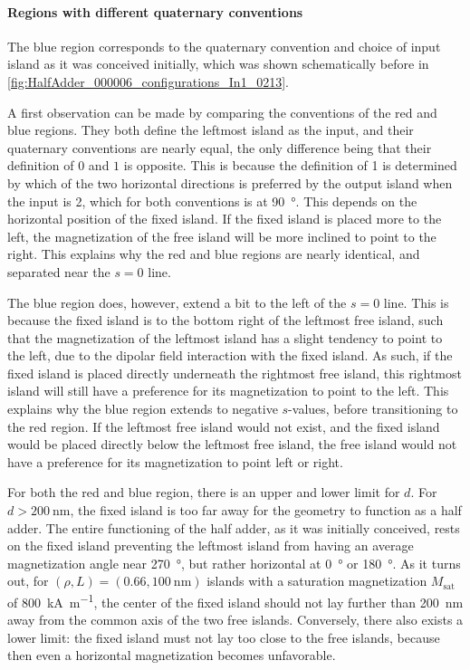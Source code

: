 \documentclass[11pt,a4paper,english,twoside]{article}
\begin{document}
\paragraph{Regions with different quaternary conventions}
The blue region corresponds to the quaternary convention and choice of input island as it was conceived initially, which was shown schematically before in \cref{fig:HalfAdder_000006_configurations_In1_0213}. \par
A first observation can be made by comparing the conventions of the red and blue regions. They both define the leftmost island as the input, and their quaternary conventions are nearly equal, the only difference being that their definition of $0$ and $1$ is opposite. This is because the definition of 1 is determined by which of the two horizontal directions is preferred by the output island when the input is 2, which for both conventions is at \SI{90}{\degree}. This depends on the horizontal position of the fixed island. If the fixed island is placed more to the left, the magnetization of the free island will be more inclined to point to the right. This explains why the red and blue regions are nearly identical, and separated near the $s=0$ line. \par
The blue region does, however, extend a bit to the left of the $s=0$ line. This is because the fixed island is to the bottom right of the leftmost free island, such that the magnetization of the leftmost island has a slight tendency to point to the left, due to the dipolar field interaction with the fixed island. As such, if the fixed island is placed directly underneath the rightmost free island, this rightmost island will still have a preference for its magnetization to point to the left. This explains why the blue region extends to negative $s$-values, before transitioning to the red region. If the leftmost free island would not exist, and the fixed island would be placed directly below the leftmost free island, the free island would not have a preference for its magnetization to point left or right. \par
For both the red and blue region, there is an upper and lower limit for $d$. For $d>\SI{200}{\nano\metre}$, the fixed island is too far away for the geometry to function as a half adder. The entire functioning of the half adder, as it was initially conceived, rests on the fixed island preventing the leftmost island from having an average magnetization angle near \SI{270}{\degree}, but rather horizontal at \SI{0}{\degree} or \SI{180}{\degree}. As it turns out, for $(\rho, L) = (0.66,\SI{100}{\nano\metre})$ islands with a saturation magnetization $M_\mathrm{sat}$ of \SI{800}{\kilo\ampere\per\metre}, the center of the fixed island should not lay further than \SI{200}{\nano\metre} away from the common axis of the two free islands. Conversely, there also exists a lower limit: the fixed island must not lay too close to the free islands, because then even a horizontal magnetization becomes unfavorable. \par
\end{document}
